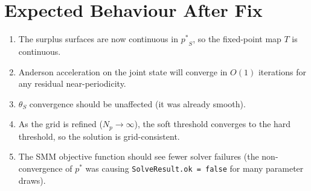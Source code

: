 \documentclass[11pt,a4paper]{article}
\newcommand{\pstar}{\mathord{p^{*}}}
\newcommand{\code}[1]{\texttt{#1}}
\theoremstyle{definition}
\begin{document}
\section{Expected Behaviour After Fix}

\begin{enumerate}
    \item The surplus surfaces are now continuous in $\pstar_S$, so the
          fixed-point map $T$ is continuous.
    \item Anderson acceleration on the joint state will converge in $O(1)$
          iterations for any residual near-periodicity.
    \item $\theta_S$ convergence should be unaffected (it was already
          smooth).
    \item As the grid is refined ($N_p \to \infty$), the soft threshold
          converges to the hard threshold, so the solution is
          grid-consistent.
    \item The SMM objective function should see fewer solver failures (the
          non-convergence of $\pstar$ was causing
          \code{SolveResult.ok = false} for many parameter draws).
\end{enumerate}
\end{document}
